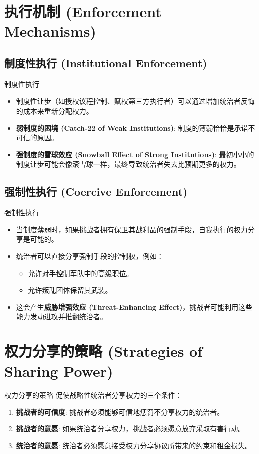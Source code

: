 \documentclass[aspectratio=169]{ctexbeamer}
\begin{document}
\section{执行机制 (Enforcement Mechanisms)}
\subsection{制度性执行 (Institutional Enforcement)}
\begin{frame}{制度性执行}
  \begin{itemize}
    \item 制度性让步（如授权议程控制、赋权第三方执行者）可以通过增加统治者反悔的成本来重新分配权力。
    \item \textbf{弱制度的困境 (Catch-22 of Weak Institutions)}: 制度的薄弱恰恰是承诺不可信的原因。
    \item \textbf{强制度的雪球效应 (Snowball Effect of Strong Institutions)}: 最初小小的制度让步可能会像滚雪球一样，最终导致统治者失去比预期更多的权力。
  \end{itemize}
\end{frame}

\subsection{强制性执行 (Coercive Enforcement)}
\begin{frame}{强制性执行}
  \begin{itemize}
    \item 当制度薄弱时，如果挑战者拥有保卫其战利品的强制手段，自我执行的权力分享是可能的。
    \item 统治者可以直接分享强制手段的控制权，例如：
    \begin{itemize}
      \item 允许对手控制军队中的高级职位。
      \item 允许叛乱团体保留其武装。
    \end{itemize}
    \item 这会产生\textbf{威胁增强效应 (Threat-Enhancing Effect)}，挑战者可能利用这些能力发动进攻并推翻统治者。
  \end{itemize}
\end{frame}

\section{权力分享的策略 (Strategies of Sharing Power)}
\begin{frame}{权力分享的策略}
  促使战略性统治者分享权力的三个条件：
  \begin{enumerate}
    \item<1-> \textbf{挑战者的可信度}: 挑战者必须能够可信地惩罚不分享权力的统治者。
    \item<2-> \textbf{挑战者的意愿}: 如果统治者分享权力，挑战者必须愿意放弃采取有害行动。
    \item<3-> \textbf{统治者的意愿}: 统治者必须愿意接受权力分享协议所带来的约束和租金损失。
  \end{enumerate}
\end{frame}
\end{document}
